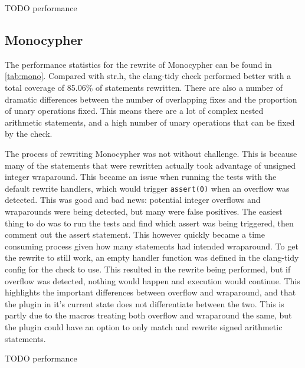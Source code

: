 TODO performance

\subsection{Monocypher}

The performance statistics for the rewrite of Monocypher can be found in \ref{tab:mono}. Compared with str.h, the clang-tidy check performed better with a total coverage of 85.06\% of statements rewritten. There are also a number of dramatic differences between the number of overlapping fixes and the proportion of unary operations fixed. This means there are a lot of complex nested arithmetic statements, and a high number of unary operations that can be fixed by the check.

The process of rewriting Monocypher was not without challenge. This is because many of the statements that were rewritten actually took advantage of unsigned integer wraparound. This became an issue when running the tests with the default rewrite handlers, which would trigger \texttt{assert(0)} when an overflow was detected. This was good and bad news: potential integer overflows and wraparounds were being detected, but many were false positives. The easiest thing to do was to run the tests and find which assert was being triggered, then comment out the assert statement. This however quickly became a time consuming process given how many statements had intended wraparound. To get the rewrite to still work, an empty handler function was defined in the clang-tidy config for the check to use. This resulted in the rewrite being performed, but if overflow was detected, nothing would happen and execution would continue. This highlights the important differences between overflow and wraparound, and that the plugin in it's current state does not differentiate between the two. This is partly due to the macros treating both overflow and wraparound the same, but the plugin could have an option to only match and rewrite signed arithmetic statements.

TODO performance

